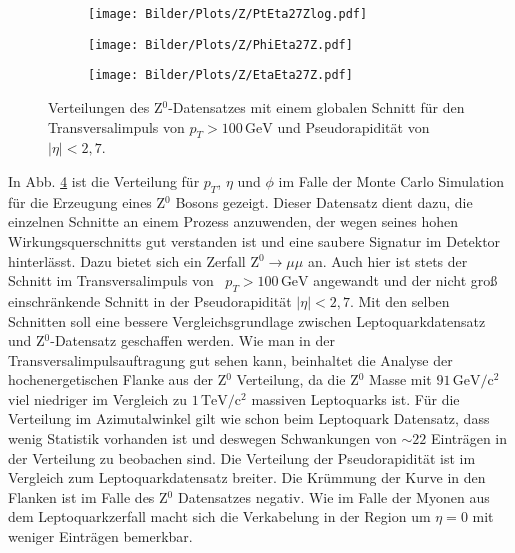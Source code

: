 \begin{figure}
  \begin{subfigure}[t]{0.55\textwidth}
  \texttt{[image: Bilder/Plots/Z/PtEta27Zlog.pdf]}
  \label{PtEta27Z}
  \end{subfigure}
\begin{subfigure}[t]{0.55\textwidth}
 \texttt{[image: Bilder/Plots/Z/PhiEta27Z.pdf]}
  \label{PhiEta27Z}
\end{subfigure}
\begin{subfigure}[t]{0.55\textwidth}
  \texttt{[image: Bilder/Plots/Z/EtaEta27Z.pdf]}
  \label{EtaEta27Z}
\end{subfigure}
\caption{Verteilungen des Z$^0$-Datensatzes mit einem globalen Schnitt für den Transversalimpuls von \mbox{$p_T>100\,\text{GeV}$} und Pseudorapidität von \mbox{$|\eta|<2,7$}.}
\label{PtEtaPhiZ}
\end{figure}  
In Abb. \ref{PtEtaPhiZ} ist die Verteilung für $p_T$, $\eta$ und $\phi$ im Falle der Monte Carlo Simulation für die Erzeugung eines Z$^0$ Bosons gezeigt. Dieser Datensatz dient dazu, die einzelnen Schnitte an einem Prozess anzuwenden, der wegen seines hohen Wirkungsquerschnitts gut verstanden ist und eine saubere Signatur im Detektor hinterlässt. Dazu bietet sich ein Zerfall Z$^0\rightarrow \mu\mu$ an. Auch hier ist stets der Schnitt im Transversalimpuls von ~$p_T>100\,\text{GeV}$ angewandt und der nicht groß einschränkende Schnitt in der Pseudorapidität $|\eta|<2{,}7$. Mit den selben Schnitten soll eine bessere Vergleichsgrundlage zwischen Leptoquarkdatensatz und Z$^0$-Datensatz geschaffen werden. Wie man in der Transversalimpulsauftragung gut sehen kann, beinhaltet die Analyse der hochenergetischen Flanke aus der Z$^0$ Verteilung, da die Z$^0$ Masse mit $91\,\text{GeV}/\text{c}^2$\cite{PDGPhysRev} viel niedriger im Vergleich zu $1\,\text{TeV}/\text{c}^2$ massiven Leptoquarks ist. Für die Verteilung im Azimutalwinkel gilt wie schon beim Leptoquark Datensatz, dass wenig Statistik vorhanden ist und deswegen Schwankungen von $\sim22$ Einträgen in der Verteilung zu beobachen sind. Die Verteilung der Pseudorapidität ist im Ver\-gleich zum Leptoquarkdatensatz breiter. Die Krümmung der Kurve in den Flanken ist im Falle des Z$^0$ Datensatzes negativ. Wie im Falle der Myonen aus dem Leptoquarkzerfall macht sich die Verkabelung in der Region um $\eta=0$ mit weniger Einträgen bemerkbar.\\  
